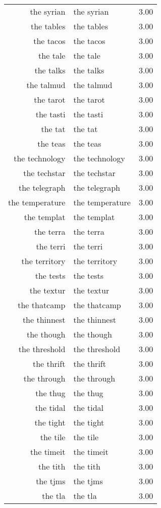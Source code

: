 \begin{table}[ht]
\begin{tabular}{rlr}
  the syrian & the syrian & 3.00 \\ 
  the tables & the tables & 3.00 \\ 
  the tacos & the tacos & 3.00 \\ 
  the tale & the tale & 3.00 \\ 
  the talks & the talks & 3.00 \\ 
  the talmud & the talmud & 3.00 \\ 
  the tarot & the tarot & 3.00 \\ 
  the tasti & the tasti & 3.00 \\ 
  the tat & the tat & 3.00 \\ 
  the teas & the teas & 3.00 \\ 
  the technology & the technology & 3.00 \\ 
  the techstar & the techstar & 3.00 \\ 
  the telegraph & the telegraph & 3.00 \\ 
  the temperature & the temperature & 3.00 \\ 
  the templat & the templat & 3.00 \\ 
  the terra & the terra & 3.00 \\ 
  the terri & the terri & 3.00 \\ 
  the territory & the territory & 3.00 \\ 
  the tests & the tests & 3.00 \\ 
  the textur & the textur & 3.00 \\ 
  the thatcamp & the thatcamp & 3.00 \\ 
  the thinnest & the thinnest & 3.00 \\ 
  the though & the though & 3.00 \\ 
  the threshold & the threshold & 3.00 \\ 
  the thrift & the thrift & 3.00 \\ 
  the through & the through & 3.00 \\ 
  the thug & the thug & 3.00 \\ 
  the tidal & the tidal & 3.00 \\ 
  the tight & the tight & 3.00 \\ 
  the tile & the tile & 3.00 \\ 
  the timeit & the timeit & 3.00 \\ 
  the tith & the tith & 3.00 \\ 
  the tjms & the tjms & 3.00 \\ 
  the tla & the tla & 3.00 \\ 

\end{tabular}
\end{table}
